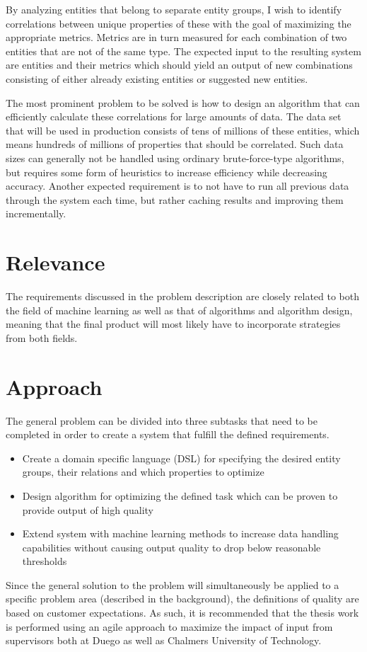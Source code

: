 \documentclass{article}
\begin{document}
By analyzing entities that belong to separate entity groups, I wish to identify correlations between unique properties of these with the goal of maximizing the appropriate metrics. Metrics are in turn measured for each combination of two entities that are not of the same type. The expected input to the resulting system are entities and their metrics which should yield an output of new combinations consisting of either already existing entities or suggested new entities.

The most prominent problem to be solved is how to design an algorithm that can efficiently calculate these correlations for large amounts of data. The data set that will be used in production consists of tens of millions of these entities, which means hundreds of millions of properties that should be correlated. Such data sizes can generally not be handled using ordinary brute-force-type algorithms, but requires some form of heuristics to increase efficiency while decreasing accuracy. Another expected requirement is to not have to run all previous data through the system each time, but rather caching results and improving them incrementally.

\section{Relevance}
The requirements discussed in the problem description are closely related to both the field of machine learning as well as that of algorithms and algorithm design, meaning that the final product will most likely have to incorporate strategies from both fields.

\section{Approach}
\label{sec:approach}
The general problem can be divided into three subtasks that need to be completed in order to create a system that fulfill the defined requirements.
\begin{itemize}
	\item Create a domain specific language (DSL) for specifying the desired entity groups, their relations and which properties to optimize
	\item Design algorithm for optimizing the defined task which can be proven to provide output of high quality 
	\item Extend system with machine learning methods to increase data handling capabilities without causing output quality to drop below reasonable thresholds
\end{itemize}
Since the general solution to the problem will simultaneously be applied to a specific problem area (described in the background), the definitions of quality are based on customer expectations. As such, it is recommended that the thesis work is performed using an agile approach to maximize the impact of input from supervisors both at Duego as well as Chalmers University of Technology.
\end{document}
